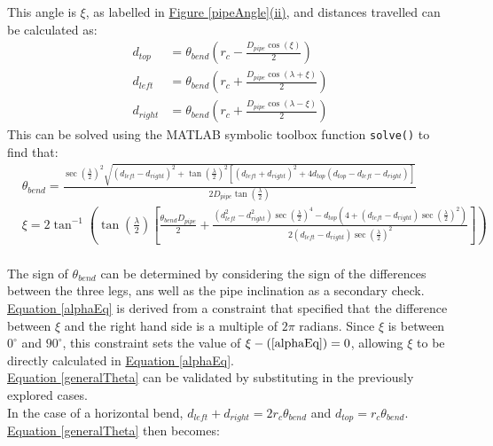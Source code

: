 \documentclass[11pt]{article}		%
\newcommand{\equationref}[1]{\hyperref[#1]{Equation \ref*{#1}}}     %
\begin{document}
			This angle is $\xi$, as labelled in \hyperref[pipeAngle]{Figure \ref*{pipeAngle}(ii)}, and distances travelled can be calculated as:
			\begin{align}
				d_{top} &= \theta_{bend} \left( r_c - \frac{D_{pipe} \cos \left( \xi \right)}{2} \right) \label{d_top}
				\\
				d_{left} &= \theta_{bend} \left( r_c +  \frac{D_{pipe} \cos \left( \lambda + \xi \right)}{2} \right) \label{d_left}
				\\
				d_{right} &= \theta_{bend} \left( r_c +  \frac{D_{pipe} \cos \left( \lambda - \xi \right)}{2} \right) \label{d_right}
			\end{align}
			This can be solved using the MATLAB symbolic toolbox function \verb|solve()| to find that:
			\fontsize{10}{\baselineskip}
			\begin{align}
				&\theta_{bend} = \frac{ \sec \left( \frac{\lambda}{2} \right)^2 \sqrt{ \left( d_{left} - d_{right} \right)^2 +  \tan \left( \frac{\lambda}{2} \right)^2 \left[ \left( d_{left} + d_{right} \right)^2 + 4 d_{top} \left( d_{top} - d_{left} - d_{right} \right) \right] } }{2 D_{pipe} \tan \left( \frac{\lambda}{2} \right)} \label{generalTheta}
				\\
				&\xi = 2 \tan^{-1} \left( \tan \left( \frac{\lambda}{2} \right) \left[\frac{ \theta_{bend} D_{pipe}}{2} + \frac{\left( d_{left}^2 - d_{right}^2 \right) \sec \left( \frac{\lambda}{2} \right)^4 - d_{top} \left(4 + \left( d_{left} - d_{right} \right) \sec \left( \frac{\lambda}{2} \right)^2 \right)}{2 \left( d_{left} - d_{right} \right) \sec \left( \frac{\lambda}{2} \right)^2} \right] \right) \label{alphaEq}
			\end{align}
			\fontsize{11}{\baselineskip}
			\\
	        \hspace*{3ex}The sign of $\theta_{bend}$ can be determined by considering the sign of the differences between the three legs, ans well as the pipe inclination as a secondary check.
			\\
	        \hspace*{3ex}\equationref{alphaEq} is derived from a constraint that specified that the difference between $\xi$ and the right hand side is a multiple of $2 \pi$ radians.
			Since $\xi$ is between $0^\circ$ and $90^\circ$, this constraint sets the value of $\xi - (\ref*{alphaEq}) = 0$, allowing $\xi$ to be directly calculated in \equationref{alphaEq}.
			\\
	        \hspace*{3ex}\equationref{generalTheta} can be validated by substituting in the previously explored cases.
\\
	        \hspace*{3ex}In the case of a horizontal bend, $d_{left} + d_{right} = 2 r_c \theta_{bend} $ and $d_{top} = r_c \theta_{bend}$.
			\equationref{generalTheta} then becomes:
			
\end{document}
